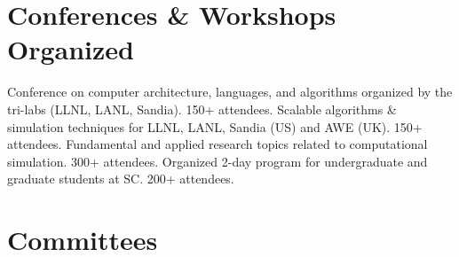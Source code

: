 


\section{Conferences \& Workshops Organized}
		{Conference on computer architecture, languages, and algorithms organized by the tri-labs (LLNL, LANL, Sandia). 150+ attendees.}
		{Scalable algorithms \& simulation techniques for LLNL, LANL, Sandia (US) and AWE (UK). 150+ attendees.}
		{%
		Fundamental and applied research topics related to %
		computational simulation. 300+ attendees.}
		{Organized 2-day program for undergraduate and graduate students at SC. 200+ attendees.}


\section{Committees}

